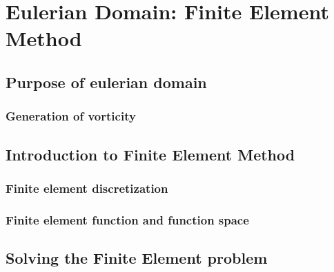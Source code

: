 \chapter{Eulerian Domain: Finite Element Method}

\section{Purpose of eulerian domain}

\subsection{Generation of vorticity}


\section{Introduction to Finite Element Method}


\subsection{Finite element discretization}


\subsection{Finite element function and function space}


\section{Solving the Finite Element problem}

